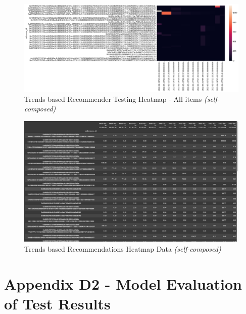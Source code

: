 \begin{figure}[h!]
\centering
\includegraphics[width=\textwidth]{images/Testing/trends/trends-heatmap-all.png}
\caption{Trends based Recommender Testing Heatmap - All items \textit{(self-composed)}}
\label{fig:trends-recsys-heatmap-all}
\end{figure}

\begin{figure}[h!]
\centering
\includegraphics[width=\textwidth]{images/Testing/trends/heatmap-data.png}
\caption{Trends based Recommendations Heatmap Data \textit{(self-composed)}}
\label{fig:trends-recsys-heatmap-data-matrix}
\end{figure}


\clearpage
\section*{Appendix D2 - Model Evaluation of Test Results}


